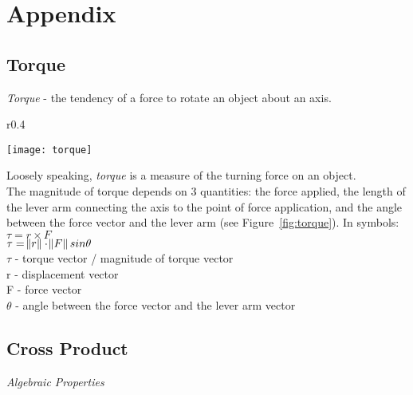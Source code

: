 \section{Appendix}

\subsection{Torque}

\textit{Torque} - the tendency of a force to rotate an object about an axis. \\

\begin{wrapfigure}{r}{0.4\textwidth}
  \begin{center}
	\texttt{[image: torque]}
  \end{center}
  \caption{}
  \label{fig:torque}
\end{wrapfigure}

Loosely speaking, \textit{torque} is a measure of the turning force on an object. \\ 

The magnitude of torque depends on 3 quantities: the force applied, the length of the lever arm connecting the axis to the point of force application, and the angle between the force vector and the lever arm (see Figure~\ref{fig:torque}). In symbols: \\
$\tau = r \times F$ \\
$\tau = \norm{r} \cdot \norm{F} sin \theta $ \\
$\tau$ - torque vector / magnitude of torque vector \\
r - displacement vector \\
F - force vector \\
$\theta$ - angle between the force vector and the lever arm vector

\clearpage

\subsection{Cross Product}
\textit{Algebraic Properties}

